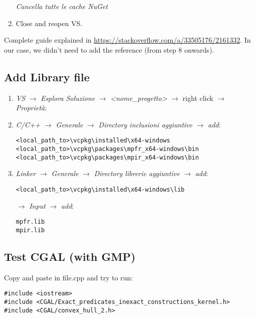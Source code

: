 \documentclass[11pt, english, openany]{report}
\begin{document}
\begin{appendices}
\begin{enumerate}
	\textit{Cancella tutte le cache NuGet}

\item Close and reopen VS.
\end{enumerate}

Complete guide explained in \href{https://stackoverflow.com/a/33505176/2161332}{https://stackoverflow.com/a/33505176/2161332}. In our case, we didn't need to add the reference (from step 8 onwards).


\subsection{Add Library file}
\begin{enumerate}
\item \textit{VS} $\rightarrow$ \textit{Esplora Soluzione} $\rightarrow$ \textit{<nome\_progetto>} $\rightarrow$ right click $\rightarrow$ \textit{Proprietà}:

\item \textit{C/C++} $\rightarrow$ \textit{Generale} $\rightarrow$ \textit{Directory inclusioni aggiuntive} $\rightarrow$ \textit{add}:

\begin{lstlisting}
<local_path_to>\vcpkg\installed\x64-windows
<local_path_to>\vcpkg\packages\mpfr_x64-windows\bin
<local_path_to>\vcpkg\packages\mpir_x64-windows\bin
\end{lstlisting}
	
\item \textit{Linker} $\rightarrow$ \textit{Generale} $\rightarrow$ \textit{Directory librerie aggiuntive} $\rightarrow$ \textit{add}:

\begin{lstlisting}
<local_path_to>\vcpkg\installed\x64-windows\lib
\end{lstlisting}

	 $\rightarrow$ \textit{Input} $\rightarrow$ \textit{add}:
\begin{lstlisting}
mpfr.lib
mpir.lib	
\end{lstlisting}
\end{enumerate}
	
\subsection{Test CGAL (with GMP)}
Copy and paste in file.cpp and try to run:

\begin{lstlisting}
#include <iostream>
#include <CGAL/Exact_predicates_inexact_constructions_kernel.h>
#include <CGAL/convex_hull_2.h>


\end{lstlisting}
\end{appendices}
\end{document}
